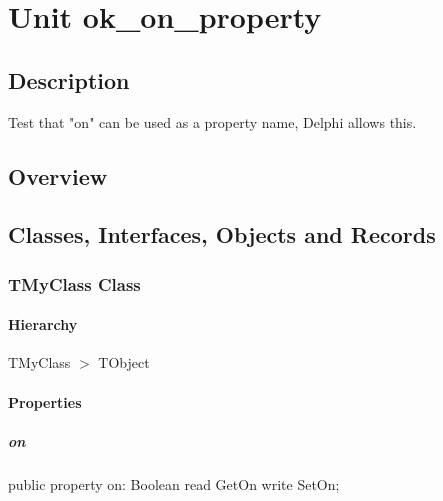 \documentclass{report}
\begin{document}
\newlength{\tmplength}
\chapter{Unit ok{\_}on{\_}property}
\section{Description}
Test that "on" can be used as a property name, Delphi allows this.
\section{Overview}
\begin{description}
\item[\texttt{\begin{ttfamily}TMyClass\end{ttfamily} Class}]
\end{description}
\section{Classes, Interfaces, Objects and Records}
\subsection*{TMyClass Class}
\subsubsection*{\large{\textbf{Hierarchy}}\normalsize\hspace{1ex}\hfill}
TMyClass {$>$} TObject
\subsubsection*{\large{\textbf{Properties}}\normalsize\hspace{1ex}\hfill}
\paragraph*{on}\hspace*{\fill}

\begin{list}{}{
\setlength{\itemindent}{0cm}
\setlength{\listparindent}{0cm}
\setlength{\leftmargin}{\evensidemargin}
\addtolength{\leftmargin}{\tmplength}
\settowidth{\labelsep}{X}
\addtolength{\leftmargin}{\labelsep}
\setlength{\labelwidth}{\tmplength}
}
\begin{flushleft}
\item[\textbf{Declaration}\hfill]
\begin{ttfamily}
public property on: Boolean read GetOn write SetOn;\end{ttfamily}


\end{flushleft}
\end{list}
\end{document}
